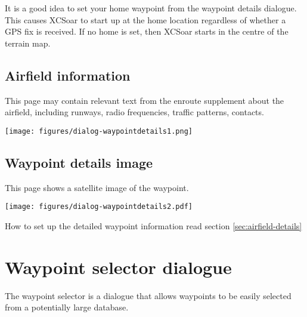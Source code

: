 It is a good idea to set your home waypoint from the waypoint details
dialogue. This causes XCSoar to start up at the home location regardless
of whether a GPS fix is received.  If no home is set, then XCSoar
starts in the centre of the terrain map.

\subsection*{Airfield information}
This page may contain relevant text from the enroute supplement about
the airfield, including runways, radio frequencies, traffic patterns,
contacts.
\begin{center}
\texttt{[image: figures/dialog-waypointdetails1.png]}
\end{center}

\subsection*{Waypoint details image}
This page shows a satellite image of the waypoint.

\begin{center}
\texttt{[image: figures/dialog-waypointdetails2.pdf]}
\end{center}
How to set up the detailed waypoint information read section \ref{sec:airfield-details}

\section{Waypoint selector dialogue}\label{sec:waypoint-selector-dialog}

The waypoint selector is a dialogue that allows waypoints to be easily selected
from a potentially large database. 

